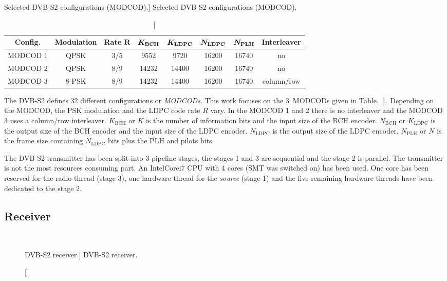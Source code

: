 \begin{table}[htp]
  \centering
  \caption
    [Selected DVB-S2 configurations (MODCOD).]
    {Selected DVB-S2 configurations (MODCOD).}
  \label{tab:dvbs2_modcod}
  \begin{tabular}{c c c c c c c c}
    \textbf{Config.} & \textbf{Modulation} & \textbf{Rate} $\bm{R}$ & $\bm{K_\text{\textbf{BCH}}}$ & $\bm{K_\text{\textbf{LDPC}}}$ & $\bm{N_\text{\textbf{LDPC}}}$ & $\bm{N_\text{\textbf{PLH}}}$ & \textbf{Interleaver}\\
    \hline \hline
    MODCOD 1 &  QPSK & 3/5 &  9552 &  9720 & 16200 & 16740 & no\\
    MODCOD 2 &  QPSK & 8/9 & 14232 & 14400 & 16200 & 16740 & no\\
    MODCOD 3 & 8-PSK & 8/9 & 14232 & 14400 & 16200 & 16740 & column/row\\
  \end{tabular}
\end{table}

The DVB-S2 defines 32 different configurations or \emph{MODCODs}. This work
focuses on the 3~MODCODs given in Table.~\ref{tab:dvbs2_modcod}. Depending on
the MODCOD, the PSK modulation and the LDPC code rate $R$ vary. In the MODCOD 1
and 2 there is no interleaver and the MODCOD 3 uses a column/row interleaver.
$K_\text{BCH}$ or $K$ is the number of information bits and the input size of
the BCH encoder. $N_\text{BCH}$ or $K_\text{LDPC}$ is the output size of the
BCH encoder and the input size of the LDPC encoder. $N_\text{LDPC}$ is the
output size of the LDPC encoder. $N_\text{PLH}$ or $N$ is the frame size
containing $N_\text{LDPC}$ bits plus the PLH and pilots bits.

The DVB-S2 transmitter has been split into 3 pipeline stages, the stages 1 and 3
are sequential and the stage 2 is parallel. The transmitter is not the most
resources consuming part. An Intel\R Core\TM i7 CPU with 4 cores (SMT
was switched on) has been used. One core has been reserved for the radio thread
(stage 3), one hardware thread for the \emph{source} (stage 1) and the five
remaining hardware threads have been dedicated to the stage 2.

\subsection{Receiver}

\begin{figure}[htp]
  \centering
  \\
  \caption
    [DVB-S2 receiver.]
    {DVB-S2 receiver.}
  \label{fig:dvbs2_receiver}
\end{figure}


